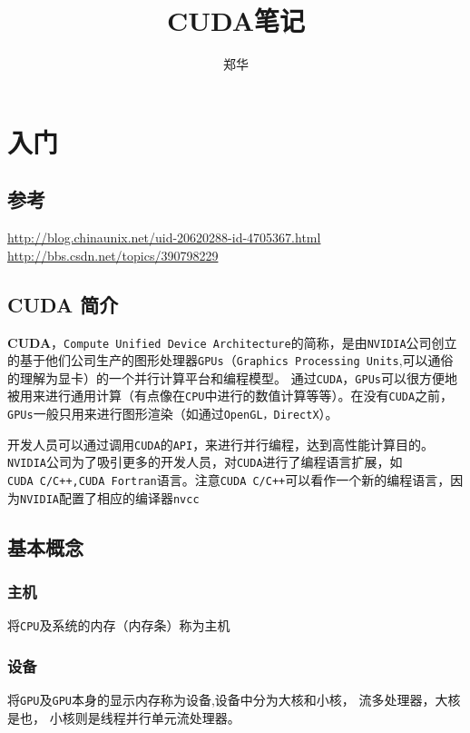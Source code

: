 \documentclass[UTF8,a4paper,12pt]{ctexbook}
\author{\kaishu 郑华}
\title{\heiti CUDA笔记}
\begin{document}
 	\maketitle
	\tableofcontents
	
\chapter{入门}
	\section{参考}\url{http://blog.chinaunix.net/uid-20620288-id-4705367.html} \\
	
	\url{http://bbs.csdn.net/topics/390798229}
	
	\section{CUDA 简介}
		\textbf{CUDA}，\verb|Compute Unified Device Architecture|的简称，是由\verb|NVIDIA|公司创立的基于他们公司生产的图形处理器\verb|GPUs|（\verb|Graphics Processing Units|,可以通俗的理解为显卡）的一个并行计算平台和编程模型。
		通过\verb|CUDA|，\verb|GPUs|可以很方便地被用来进行通用计算（有点像在\verb|CPU|中进行的数值计算等等）。在没有\verb|CUDA|之前，\verb|GPUs|一般只用来进行图形渲染（如通过\verb|OpenGL，DirectX|）。
		
		开发人员可以通过调用\verb|CUDA|的\verb|API|，来进行并行编程，达到高性能计算目的。\verb|NVIDIA|公司为了吸引更多的开发人员，对\verb|CUDA|进行了编程语言扩展，如\verb|CUDA C/C++,CUDA Fortran|语言。注意\verb|CUDA C/C++|可以看作一个新的编程语言，因为\verb|NVIDIA|配置了相应的编译器\verb|nvcc|
	
	\section{基本概念}
		\subsection{主机}
			将\verb|CPU|及系统的内存（内存条）称为主机
			
		\subsection{设备}
			将\verb|GPU|及\verb|GPU|本身的显示内存称为设备,设备中分为大核和小核， 流多处理器，大核是也， 小核则是线程并行单元流处理器。
			
\end{document}
